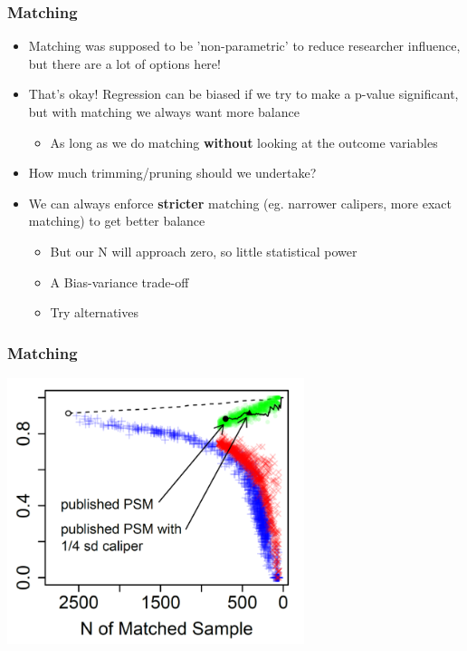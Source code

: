 \documentclass[xcolor=x11names,compress]{beamer}\usepackage[]{graphicx}\usepackage[]{color}
\renewcommand{\(}{\begin{columns}}
\renewcommand{\)}{\end{columns}}
\newcommand{\<}[1]{\begin{column}{#1}}
\renewcommand{\>}{\end{column}}
\begin{document}
\begin{frame}
\frametitle{Matching}
\begin{itemize}
\item Matching was supposed to be 'non-parametric' to reduce researcher influence, but there are a lot of options here!
\pause
\item That's okay! Regression can be biased if we try to make a p-value significant, but with matching we always want more balance
\pause
\begin{itemize}
\item As long as we do matching \textbf{without} looking at the outcome variables
\end{itemize}
\pause
\item How much trimming/pruning should we undertake?
\pause
\item We can always enforce \textbf{stricter} matching (eg. narrower calipers, more exact matching) to get better balance
\pause
\begin{itemize}
\item But our N will approach zero, so little statistical power
\pause
\item A Bias-variance trade-off
\pause
\item Try alternatives
\end{itemize}
\end{itemize}
\end{frame}

\begin{frame}
\frametitle{Matching}
\includegraphics[width=0.65\textwidth]{Balance-N_trade-off.png}
\end{frame}
\end{document}
